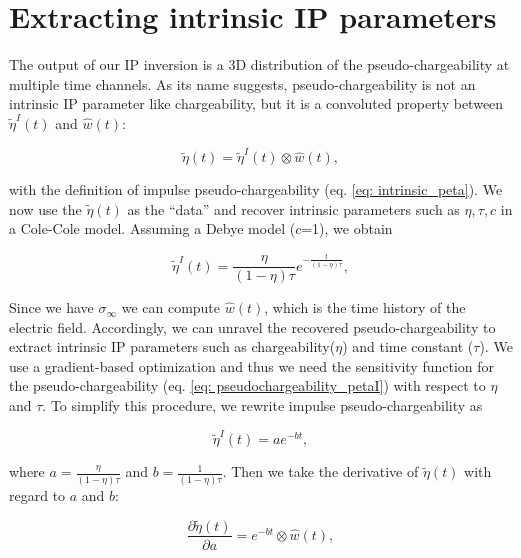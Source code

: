 \documentclass[extra,mreferee]{gji}
\newcommand{\siginf}{\sigma_\infty}
\newcommand{\peta}{\tilde{\eta}}
\begin{document}
\section{Extracting intrinsic IP parameters}
\label{section: extract_intrinsicIP}
The output of our IP inversion is a 3D distribution of the pseudo-chargeability at multiple time channels.
As its name suggests, pseudo-chargeability is not an intrinsic IP parameter like chargeability, but it is a convoluted property between $\peta^{I}(t)$ and $\hat{w}(t)$:
\begin{linenomath*}
\begin{equation}
  \peta(t) = \peta^{I}(t) \otimes \hat{w}(t),
  \label{eq: pseudochargeability_petaI}
\end{equation}
\end{linenomath*}
with the definition of impulse pseudo-chargeability (eq. \ref{eq: intrinsic_peta}).
We now use the $\peta(t)$ as the “data” and recover intrinsic parameters such as $\eta, \tau, c$ in a Cole-Cole model. Assuming a Debye model ($c$=1), we obtain
\begin{linenomath*}
\begin{equation}
    \peta^{I}(t) = \frac{\eta}{(1-\eta)\tau}e^{-\frac{t}{(1-\eta)\tau}},
    \label{eq: intrinsic_peta_debye}
\end{equation}
\end{linenomath*}
Since we have $\siginf$ we can compute $\hat{w}(t)$, which is the time history of the electric field.
Accordingly, we can unravel the recovered pseudo-chargeability to extract intrinsic IP parameters such as chargeability($\eta$) and time constant ($\tau$).
We use a gradient-based optimization and thus we need the sensitivity function for the pseudo-chargeability (eq. \ref{eq: pseudochargeability_petaI}) with respect to $\eta$ and $\tau$.
To simplify this procedure, we rewrite impulse pseudo-chargeability as
\begin{linenomath*}
\begin{equation}
  \peta^{I}(t) = a e^{-bt},
\end{equation}
\end{linenomath*}
where $a = \frac{\eta}{(1-\eta)\tau}$ and $b = \frac{1}{(1-\eta)\tau}$.
Then we take the derivative of $\peta(t)$ with regard to $a$ and $b$:
\begin{linenomath*}
\begin{equation}
  \frac{\partial \peta(t)}{\partial a} = e^{-bt} \otimes \hat{w}(t),
\end{equation}
\end{linenomath*}
\end{document}
